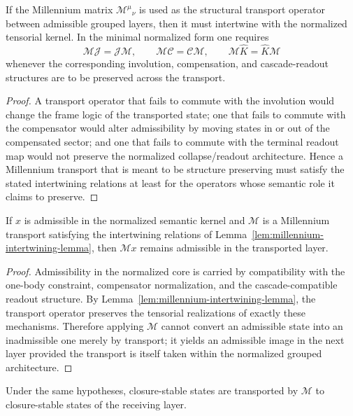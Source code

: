 \begin{lemma}
\label{lem:millennium-intertwining-lemma}
If the Millennium matrix $\mathcal M^\mu{}_{\nu}$ is used as the structural
transport operator between admissible grouped layers, then it must intertwine
with the normalized tensorial kernel. In the minimal normalized form one
requires
\[
\mathcal M\mathcal J=\mathcal J\mathcal M,
\qquad
\mathcal M\mathcal C=\mathcal C\mathcal M,
\qquad
\mathcal M\hat K=\hat K\mathcal M
\]
whenever the corresponding involution, compensation, and cascade-readout
structures are to be preserved across the transport.
\end{lemma}

\begin{proof}
A transport operator that fails to commute with the involution would change the
frame logic of the transported state; one that fails to commute with the
compensator would alter admissibility by moving states in or out of the
compensated sector; and one that fails to commute with the terminal readout map
would not preserve the normalized collapse/readout architecture. Hence a
Millennium transport that is meant to be structure preserving must satisfy the
stated intertwining relations at least for the operators whose semantic role it
claims to preserve.
\end{proof}

\begin{theorem}
\label{thm:admissibility-preservation-theorem}
If $x$ is admissible in the normalized semantic kernel and $\mathcal M$ is a
Millennium transport satisfying the intertwining relations of
Lemma~\ref{lem:millennium-intertwining-lemma}, then $\mathcal Mx$ remains
admissible in the transported layer.
\end{theorem}

\begin{proof}
Admissibility in the normalized core is carried by compatibility with the one-body
constraint, compensator normalization, and the cascade-compatible readout
structure. By Lemma~\ref{lem:millennium-intertwining-lemma}, the transport
operator preserves the tensorial realizations of exactly these mechanisms.
Therefore applying $\mathcal M$ cannot convert an admissible state into an
inadmissible one merely by transport; it yields an admissible image in the next
layer provided the transport is itself taken within the normalized grouped
architecture.
\end{proof}

\begin{theorem}
\label{thm:closure-preservation-theorem}
Under the same hypotheses, closure-stable states are transported by
$\mathcal M$ to closure-stable states of the receiving layer.
\end{theorem}

